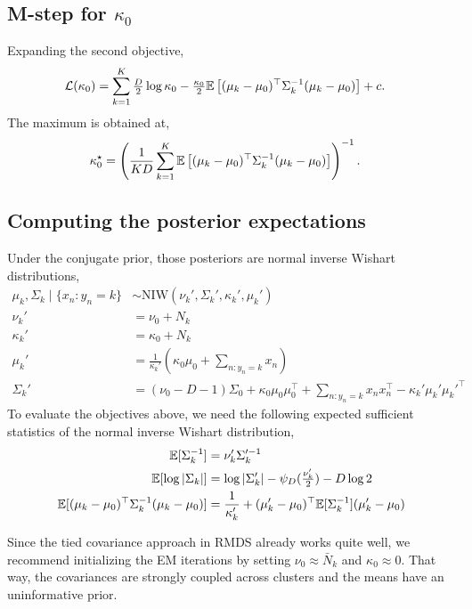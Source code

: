 \subsection{M-step for \texorpdfstring{$\kappa_0$}{κ₀}}
Expanding the second objective,
\begin{align*}
    \mathcal{L}(\kappa_0) &= \sum_{k=1}^K \tfrac{D}{2} \log \kappa_0 - \tfrac{\kappa_0}{2} \mathbb{E} \left[(\mu_k - \mu_0)^\top \Sigma_k^{-1} (\mu_k - \mu_0) \right] + c.
\end{align*}
The maximum is obtained at,
\begin{align*}
    \kappa_0^\star &= \left(\frac{1}{KD} \sum_{k=1}^K \mathbb{E} \left[(\mu_k - \mu_0)^\top \Sigma_k^{-1} (\mu_k - \mu_0) \right]\right)^{-1}.
\end{align*}

\subsection{Computing the posterior expectations}
Under the conjugate prior, those posteriors are normal inverse Wishart distributions,
\begin{align*}
    \mu_k, \Sigma_k \mid \{x_n: y_n = k\}
    &\sim \mathrm{NIW}(\nu_k', \Sigma_k', \kappa_k', \mu_k') \\
    \nu_k' &= \nu_0 + N_k \\
    \kappa_k' &= \kappa_0 + N_k \\
    \mu_k' &= \frac{1}{\kappa_k'} \left(\kappa_0 \mu_0 + \sum_{n: y_n=k} x_n \right) \\
    \Sigma_k' &= (\nu_0 - D - 1) \Sigma_0 + \kappa_0 \mu_0 \mu_0^\top + \sum_{n:y_n=k} x_n x_n^\top - \kappa_k' \mu_k' \mu_k'^\top
\end{align*}
To evaluate the objectives above, we need the following expected sufficient statistics of the normal inverse Wishart distribution,
\begin{align*}
    \mathbb{E}[\Sigma_k^{-1}] &= \nu_k' \Sigma_k'^{-1} \\
    \mathbb{E}[\log |\Sigma_k|] &= \log |\Sigma_k'| - \psi_D(\tfrac{\nu_k'}{2}) - D \log 2 \\
    \mathbb{E}[(\mu_k - \mu_0)^\top \Sigma_k^{-1} (\mu_k - \mu_0)] &= \frac{1}{\kappa_k'} + (\mu_k' - \mu_0)^\top \mathbb{E}[\Sigma_k^{-1}] (\mu_k' - \mu_0)
\end{align*}

Since the tied covariance approach in RMDS already works quite well, we recommend initializing the EM iterations by setting $\nu_0 \approx \bar{N}_k$ and $\kappa_0 \approx 0$. That way, the covariances are strongly coupled across clusters and the means have an uninformative prior.

